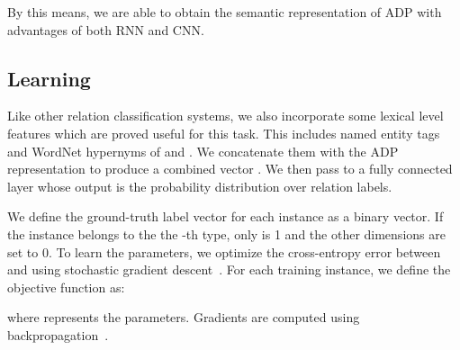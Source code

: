 \documentclass[11pt]{article}
\begin{document}
By this means, we are able to obtain the semantic representation of ADP with advantages of both RNN and CNN.


\subsection{Learning}
Like other relation classification systems, we also incorporate some lexical level features which are proved useful for this task. This includes named entity tags and WordNet hypernyms of  and . We concatenate them with the ADP representation  to produce a combined vector . We then pass  to a fully connected  layer whose output is the probability distribution  over relation labels.

We define the ground-truth label  vector  for each instance as a binary vector. If the instance belongs to the the -th type, only  is 1 and the other dimensions are set to 0. To learn the parameters, we optimize the cross-entropy error between  and  using stochastic gradient descent~\cite{bottou2004stochastic}. For each training instance, we define the objective function as:

where  represents the parameters.
Gradients are computed using backpropagation~\cite{rumelhart1988learning}.
\end{document}
